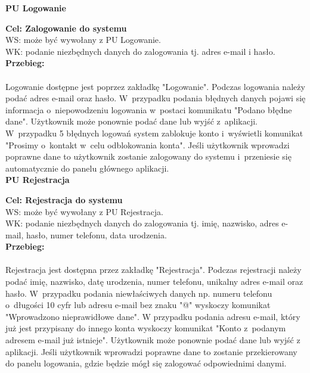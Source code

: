 \documentclass[12pt, letterpaper]{article}
\begin{document}
		
		\textbf{PU Logowanie}
		
		\quad
		
		\textbf{Cel: Zalogowanie do systemu}\\
		
		WS: może być wywołany z PU Logowanie.\\
		
		WK: podanie niezbędnych danych do zalogowania tj. adres e-mail i hasło.\\
		
		\textbf{Przebieg:}
\paragraph{}Logowanie dostępne jest poprzez zakładkę "Logowanie". Podczas logowania należy podać adres e-mail oraz hasło. W~przypadku podania błędnych danych pojawi się informacja o~niepowodzeniu logowania w~postaci komunikatu "Podano błędne dane". Użytkownik może ponownie podać dane lub wyjść z~aplikacji. W~przypadku 5 błędnych logowań system zablokuje konto i~wyświetli komunikat "Prosimy o~kontakt w~celu odblokowania konta". Jeśli użytkownik wprowadzi poprawne dane to użytkownik zostanie zalogowany do systemu i~przeniesie się automatycznie do panelu głównego aplikacji.\\
		
		
		\textbf{PU Rejestracja}
		
		\quad
		
		\textbf{Cel: Rejestracja do systemu}\\
		
		WS: może być wywołany z PU Rejestracja.\\
		
		WK: podanie niezbędnych danych do zalogowania tj. imię, nazwisko, adres e-mail, hasło, numer telefonu, data urodzenia.\\
		
		\textbf{Przebieg:}
\paragraph{}Rejestracja jest dostępna przez zakładkę "Rejestracja". Podczas rejestracji należy podać imię, nazwisko, datę urodzenia, numer telefonu, unikalny adres e-mail oraz hasło. W~przypadku podania niewłaściwych danych np. numeru telefonu o~długości 10 cyfr lub adresu e-mail bez znaku "@" wyskoczy komunikat "Wprowadzono nieprawidłowe dane". W przypadku podania adresu e-mail, który już jest przypisany do innego konta wyskoczy komunikat "Konto z~podanym adresem e-mail już istnieje". Użytkownik może ponownie podać dane lub wyjść z aplikacji. Jeśli użytkownik wprowadzi poprawne dane to zostanie przekierowany do panelu logowania, gdzie będzie mógł się zalogować odpowiednimi danymi.\\
		
\end{document}
